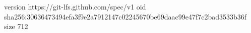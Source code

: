 version https://git-lfs.github.com/spec/v1
oid sha256:30636473494efa3f9e2a7912147c02245670be69daac99e47f7c2bad3533b36f
size 712
